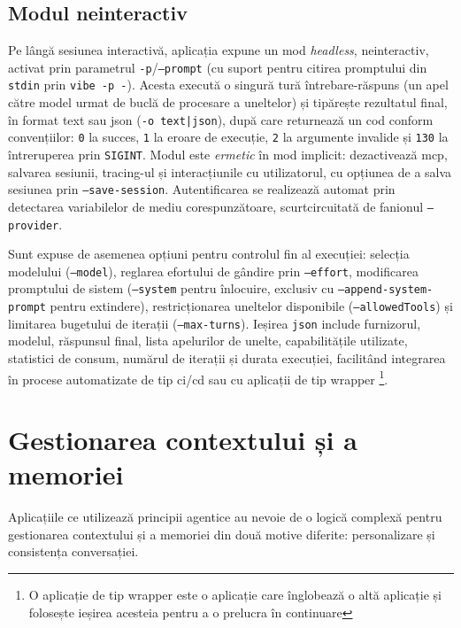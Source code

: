 \documentclass[12pt, a4paper, oneside, romanian]{teza-upb}
\begin{document}
    \subsection{Modul neinteractiv}

    Pe lângă sesiunea interactivă, aplicația expune un mod \emph{headless}, neinteractiv, activat prin parametrul \texttt{-p}/\texttt{--prompt} (cu suport pentru citirea promptului din \texttt{stdin} prin \texttt{vibe -p -}). Acesta execută o singură tură întrebare-răspuns (un apel către model urmat de buclă de
    procesare a uneltelor) și tipărește rezultatul final, în format text sau \ac{json} (\texttt{-o text|json}), după care returnează un cod conform convențiilor: \texttt{0} la succes, \texttt{1} la eroare de execuție, \texttt{2} la argumente invalide și \texttt{130} la întreruperea prin
    \texttt{SIGINT}. Modul este \emph{ermetic} în mod implicit: dezactivează \ac{mcp}, salvarea sesiunii, tracing-ul și interacțiunile cu utilizatorul, cu opțiunea de a salva sesiunea prin \texttt{--save-session}. Autentificarea se realizează automat prin detectarea variabilelor de mediu
    corespunzătoare, scurtcircuitată de fanionul \texttt{--provider}.

    Sunt expuse de asemenea opțiuni pentru controlul fin al execuției: selecția modelului (\texttt{--model}), reglarea efortului de gândire prin \texttt{--effort}, modificarea promptului de sistem
    (\texttt{--system} pentru înlocuire, exclusiv cu \texttt{--append-system-prompt} pentru extindere), restricționarea uneltelor disponibile (\texttt{--allowedTools}) și limitarea bugetului de iterații (\texttt{--max-turns}). Ieșirea \texttt{json} include furnizorul, modelul, răspunsul final,
    lista apelurilor de unelte, capabilitățile utilizate, statistici de consum, numărul de iterații și durata execuției, facilitând integrarea în procese automatizate de tip \ac{ci}/\ac{cd} sau cu aplicații de tip wrapper
    \footnote{O aplicație de tip wrapper este o aplicație care înglobează o altă aplicație și folosește ieșirea acesteia pentru a o prelucra în continuare}.

  \section{Gestionarea contextului și a memoriei}

  Aplicațiile ce utilizează principii agentice au nevoie de o logică complexă pentru gestionarea contextului și a memoriei din două motive diferite:
  personalizare și consistența conversației.
\end{document}
